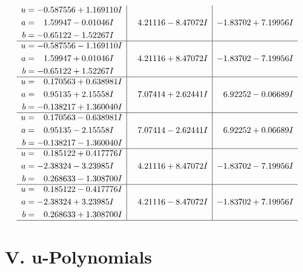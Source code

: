 \documentclass[1p]{elsarticle_modified}
\theoremstyle{definition}
\begin{document}
$$\begin{array}{c|c|c}
\begin{aligned}
u &= -0.587556 + 1.169110 I \\
a &= \phantom{-}1.59947 - 0.01046 I \\
b &= -0.65122 - 1.52267 I\end{aligned}
 & \phantom{-}4.21116 - 8.47072 I & -1.83702 + 7.19956 I \\ \hline\begin{aligned}
u &= -0.587556 - 1.169110 I \\
a &= \phantom{-}1.59947 + 0.01046 I \\
b &= -0.65122 + 1.52267 I\end{aligned}
 & \phantom{-}4.21116 + 8.47072 I & -1.83702 - 7.19956 I \\ \hline\begin{aligned}
u &= \phantom{-}0.170563 + 0.638981 I \\
a &= \phantom{-}0.95135 + 2.15558 I \\
b &= -0.138217 + 1.360040 I\end{aligned}
 & \phantom{-}7.07414 + 2.62441 I & \phantom{-}6.92252 - 0.06689 I \\ \hline\begin{aligned}
u &= \phantom{-}0.170563 - 0.638981 I \\
a &= \phantom{-}0.95135 - 2.15558 I \\
b &= -0.138217 - 1.360040 I\end{aligned}
 & \phantom{-}7.07414 - 2.62441 I & \phantom{-}6.92252 + 0.06689 I \\ \hline\begin{aligned}
u &= \phantom{-}0.185122 + 0.417776 I \\
a &= -2.38324 - 3.23985 I \\
b &= \phantom{-}0.268633 - 1.308700 I\end{aligned}
 & \phantom{-}4.21116 + 8.47072 I & -1.83702 - 7.19956 I \\ \hline\begin{aligned}
u &= \phantom{-}0.185122 - 0.417776 I \\
a &= -2.38324 + 3.23985 I \\
b &= \phantom{-}0.268633 + 1.308700 I\end{aligned}
 & \phantom{-}4.21116 - 8.47072 I & -1.83702 + 7.19956 I\\
 \hline 
 \end{array}$$\newpage
\newpage\renewcommand{\arraystretch}{1}
\centering \section*{ V. u-Polynomials}
\end{document}
